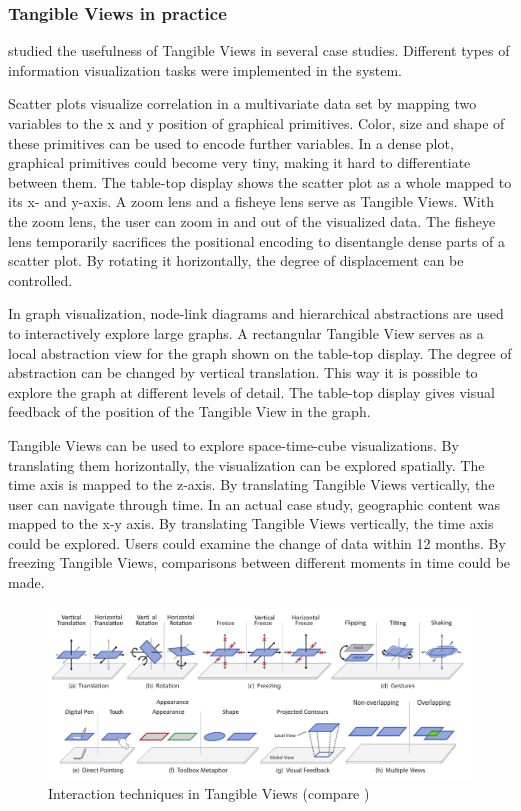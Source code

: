 \subsubsection{Tangible Views in practice}
\cite{spindler10} studied the usefulness of Tangible Views in several case studies. Different types of information visualization tasks were implemented in the system. 

Scatter plots visualize correlation in a multivariate data set by mapping two variables to the  x and y position of graphical primitives. Color, size and shape of these primitives can be used to encode further variables. In a dense plot, graphical primitives could become very tiny, making it hard to differentiate between them. The table-top display shows the scatter plot as a whole mapped to its x- and y-axis. A zoom lens and a fisheye lens serve as Tangible Views. With the zoom lens, the user can zoom in and out of the visualized data. The fisheye lens temporarily sacrifices the positional encoding to disentangle dense parts of a scatter plot. By rotating it horizontally, the degree of displacement can be controlled.

In graph visualization, node-link diagrams and hierarchical abstractions are used to interactively explore large graphs. A rectangular Tangible View serves as a local abstraction view for the graph shown on the table-top display. The degree of abstraction can be changed by vertical translation. This way it is possible to explore the graph at different levels of detail. The table-top display gives visual feedback of the position of the Tangible View in the graph.

Tangible Views can be used to explore space-time-cube visualizations. By translating them horizontally, the visualization can be explored spatially. The time axis is mapped to the z-axis. By translating Tangible Views vertically, the user can navigate through time. In an actual case study, geographic content was mapped to the x-y axis. By translating Tangible Views vertically, the time axis could be explored. Users could examine the change of data within 12 months. By freezing Tangible Views, comparisons between different moments in time could be made.

\begin{figure}[htb]
\centering
\includegraphics[width=1.0\textwidth]{figures/tangible_views_interaction.pdf}
\caption{Interaction techniques in Tangible Views (compare \protect\cite{spindler10})}
\label{fig:tangible_views_interaction}
\end{figure}

